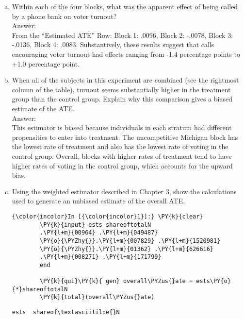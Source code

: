 \documentclass[11pt,notitlepage]{article}\usepackage[]{graphicx}\usepackage[]{color}
\makeatletter
\newenvironment{kframe}{%
 \def\at@end@of@kframe{}%
 \ifinner\ifhmode%
  \def\at@end@of@kframe{\end{minipage}}%
  \begin{minipage}{\columnwidth}%
 \fi\fi%
 \def\FrameCommand##1{\hskip\@totalleftmargin \hskip-\fboxsep
 \colorbox{shadecolor}{##1}\hskip-\fboxsep
     \hskip-\linewidth \hskip-\@totalleftmargin \hskip\columnwidth}%
 \MakeFramed {\advance\hsize-\width
   \@totalleftmargin\z@ \linewidth\hsize
   \@setminipage}}%
 {\par\unskip\endMakeFramed%
 \at@end@of@kframe}
\newenvironment{knitrout}{}{} %
\makeatother
\begin{document}
\begin{enumerate}[a)]
\item Within each of the four blocks, what was the apparent effect of being called by a phone bank on voter turnout?  \\
Answer:\\
From the ``Estimated ATE'' Row: Block 1: .0096, Block 2: -.0078, Block 3: -.0136, Block 4: .0083.  Substantively, these results suggest that calls encouraging voter turnout had effects ranging from -1.4 percentage points to +1.0 percentage point.
\item When all of the subjects in this experiment are combined (see the rightmost column of the table), turnout seems substantially higher in the treatment group than the control group.  Explain why this comparison gives a biased estimate of the ATE.\\
Answer:\\
This estimator is biased because individuals in each stratum had different propensities to enter into treatment. The uncompetitive Michigan block has the lowest rate of treatment and also has the lowest rate of voting in the control group. Overall, blocks with higher rates of treatment tend to have higher rates of voting in the control group, which accounts for the upward bias.
\item Using the weighted estimator described in Chapter 3, show the calculations used to generate an unbiased estimate of the overall ATE. 
\begin{knitrout}
\color{fgcolor}\begin{kframe}

    \begin{Verbatim}[commandchars=\\\{\}]
{\color{incolor}In [{\color{incolor}1}]:} \PY{k}{clear}
        \PY{k}{input} ests shareoftotalN
        .\PY{l+m}{00964} .\PY{l+m}{049487}
        \PY{o}{\PYZhy{}}.\PY{l+m}{007829} .\PY{l+m}{1520981}
        \PY{o}{\PYZhy{}}.\PY{l+m}{01362} .\PY{l+m}{626616}
        .\PY{l+m}{008271} .\PY{l+m}{171799}
        end
        
        \PY{k}{qui}\PY{k}{ gen} overall\PYZus{}ate = ests\PY{o}{*}shareoftotalN
        \PY{k}{total}(overall\PYZus{}ate)
\end{Verbatim}

    \begin{Verbatim}[commandchars=\\\{\}]
        ests  shareof\textasciitilde{}N


\end{Verbatim}
\end{kframe}
\end{knitrout}
\end{enumerate}
\end{document}

